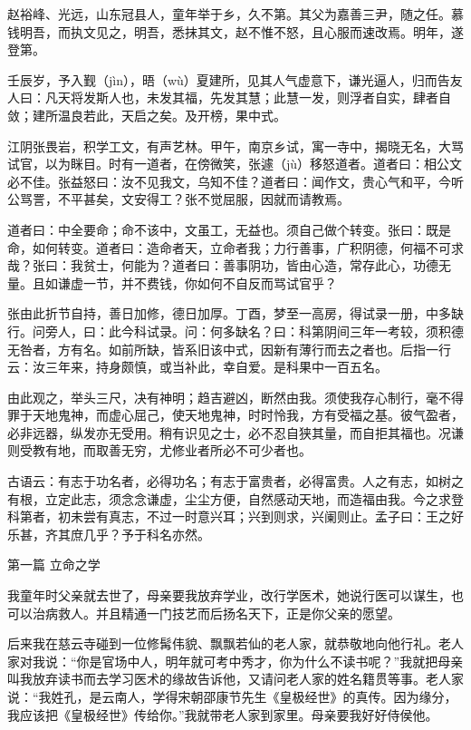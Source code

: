 \documentclass[12pt,UTF8]{ctexbook}
\begin{document}
赵裕峰、光远，山东冠县人，童年举于乡，久不第。其父为嘉善三尹，随之任。慕钱明吾，而执文见之，明吾，悉抹其文，赵不惟不怒，且心服而速改焉。明年，遂登第。

壬辰岁，予入觐（jìn），晤（wù）夏建所，见其人气虚意下，谦光逼人，归而告友人曰：凡天将发斯人也，未发其福，先发其慧；此慧一发，则浮者自实，肆者自敛；建所温良若此，天启之矣。及开榜，果中式。

江阴张畏岩，积学工文，有声艺林。甲午，南京乡试，寓一寺中，揭晓无名，大骂试官，以为眯目。时有一道者，在傍微笑，张遽（jù）移怒道者。道者曰：相公文必不佳。张益怒曰：汝不见我文，乌知不佳？道者曰：闻作文，贵心气和平，今听公骂詈，不平甚矣，文安得工？张不觉屈服，因就而请教焉。

道者曰：中全要命；命不该中，文虽工，无益也。须自己做个转变。张曰：既是命，如何转变。道者曰：造命者天，立命者我；力行善事，广积阴德，何福不可求哉？张曰：我贫士，何能为？道者曰：善事阴功，皆由心造，常存此心，功德无量。且如谦虚一节，并不费钱，你如何不自反而骂试官乎？

张由此折节自持，善日加修，德日加厚。丁酉，梦至一高房，得试录一册，中多缺行。问旁人，曰：此今科试录。问：何多缺名？曰：科第阴间三年一考较，须积德无咎者，方有名。如前所缺，皆系旧该中式，因新有薄行而去之者也。后指一行云：汝三年来，持身颇慎，或当补此，幸自爱。是科果中一百五名。

由此观之，举头三尺，决有神明；趋吉避凶，断然由我。须使我存心制行，毫不得罪于天地鬼神，而虚心屈己，使天地鬼神，时时怜我，方有受福之基。彼气盈者，必非远器，纵发亦无受用。稍有识见之士，必不忍自狭其量，而自拒其福也。况谦则受教有地，而取善无穷，尤修业者所必不可少者也。

古语云：有志于功名者，必得功名；有志于富贵者，必得富贵。人之有志，如树之有根，立定此志，须念念谦虚，尘尘方便，自然感动天地，而造福由我。今之求登科第者，初未尝有真志，不过一时意兴耳；兴到则求，兴阑则止。孟子曰：王之好乐甚，齐其庶几乎？予于科名亦然。



第一篇 立命之学

我童年时父亲就去世了，母亲要我放弃学业，改行学医术，她说行医可以谋生，也可以治病救人。并且精通一门技艺而后扬名天下，正是你父亲的愿望。

后来我在慈云寺碰到一位修髯伟貌、飘飘若仙的老人家，就恭敬地向他行礼。老人家对我说：“你是官场中人，明年就可考中秀才，你为什么不读书呢？”我就把母亲叫我放弃读书而去学习医术的缘故告诉他，又请问老人家的姓名籍贯等事。老人家说：“我姓孔，是云南人，学得宋朝邵康节先生《皇极经世》的真传。因为缘分，我应该把《皇极经世》传给你。”我就带老人家到家里。母亲要我好好侍侯他。
\end{document}
